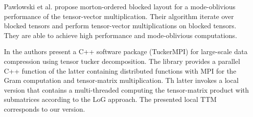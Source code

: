 Pawlowski et al. \cite{pawlowski:2019:morton.tensor.computations} propose morton-ordered blocked layout for a mode-oblivious performance of the tensor-vector multiplication.
Their algorithm iterate over blocked tensors and perform tensor-vector multiplications on blocked tensors.
They are able to achieve high performance and mode-oblivious computations.


In \cite{ballard:2020:tuckermpi} the authors present a C++ software package (TuckerMPI) for large-scale data compression using tensor tucker decomposition.
The library provides a parallel C++ function of the latter containing distributed functions with MPI for the Gram computation and tensor-matrix multiplication.
Th latter invokes a local version that contains a multi-threaded  computing the tensor-matrix product with submatrices according to the LoG approach.
The presented local TTM corresponds to our  version.
\begin{comment}
 which is used 
The local version is used in the global version of the TTM.
* the parallel/global version distributes the tensor in blockwise fashion (algorithm 2) 
* the product sizes in TuckerMPI (sec. 2.1) are called strides in our TTM paper (sec 3.4).
* the index to linear and its inverse transformation idx2lin/lin2indx transformation is genearlized in our TTM paper (sec.3.4)
* algorithm 3 (sec. 5.3) corresponds to function `<par-gemm,subtensor>` version in our TTM paper (sec 4.4.1)
\end{comment}


